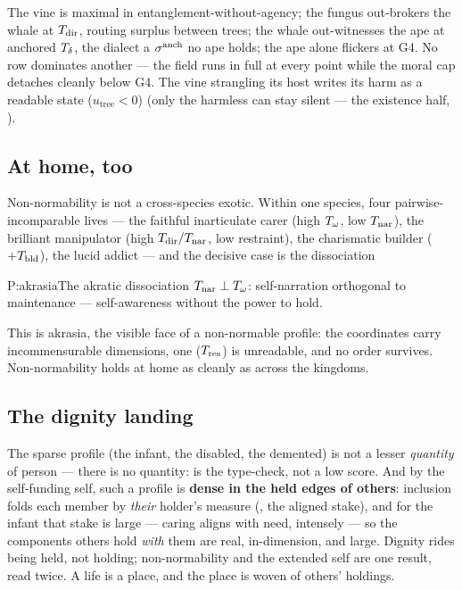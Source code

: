 \documentclass[../main]{subfiles}
\begin{document}
\noindent The vine is maximal in entanglement-without-agency; the fungus out-brokers the
whale at $T\sb{\mathrm{dir}}$, routing surplus between trees; the whale out-witnesses the ape at anchored
$T\sb{\delta}$, the dialect a $\sigma\sp{\mathrm{anch}}$ no ape holds; the ape alone flickers at G4. No
row dominates another --- the field runs in full at every point while the moral cap detaches
cleanly below G4. The vine strangling its host writes its harm as a readable state
($u_{\text{tree}}<0$) (only the harmless can stay silent --- the existence half,
).

\subsection{At home, too}
\label{subsec:prof:athome}
%
Non-normability is not a cross-species exotic. Within one species, four pairwise-incomparable
lives --- the faithful inarticulate carer (high $T\sb{\omega}$, low $T\sb{\mathrm{nar}}$), the brilliant
manipulator (high $T\sb{\mathrm{dir}}/T\sb{\mathrm{nar}}$, low restraint), the charismatic builder ($+T\sb{\mathrm{bld}}$), the
lucid addict --- and the decisive case is the dissociation
\begin{statement}{P:akrasia}{The akratic dissociation}
  $T\sb{\mathrm{nar}}\perp T\sb{\omega}$: self-narration orthogonal to maintenance --- self-awareness
  without the power to hold.
\end{statement}
This is akrasia, the visible face of a non-normable profile: the coordinates carry
incommensurable dimensions, one ($T\sb{\mathrm{res}}$) is unreadable, and no order survives.
Non-normability holds at home as cleanly as across the kingdoms.


\subsection{The dignity landing}
\label{subsec:prof:dignity}
%
The sparse profile (the infant, the disabled, the demented) is not a lesser
\emph{quantity} of person --- there is no quantity:  is the type-check, not
a low score. And by the self-funding self, such a profile is \textbf{dense in the held edges
of others}: inclusion folds each member by \emph{their} holder's measure (, the
aligned stake), and for the infant that stake is large --- caring aligns with need, intensely
--- so the components others hold \emph{with} them are real, in-dimension, and large. Dignity
rides being held, not holding; non-normability and the extended self are one result, read
twice. A life is a place, and the place is woven of others' holdings.

\end{document}
